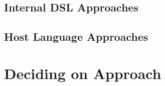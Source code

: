 
	\subsection{Internal DSL Approaches} %
	\label{ssub:internal_dsl_approaches}
	

	\subsection{Host Language Approaches} %
	\label{sub:host_language_approaches}
	


\section{Deciding on Approach} %
\label{sec:deciding_on_approach}

